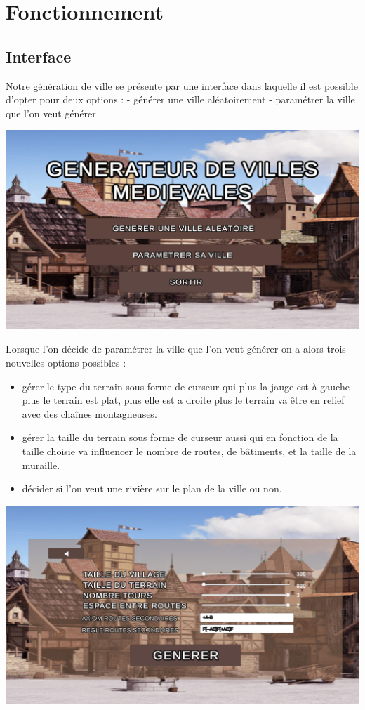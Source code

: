 \section{Fonctionnement}

\subsection{Interface}

Notre génération de ville se présente par une interface dans laquelle il est possible d'opter pour deux options :
		- générer une ville aléatoirement 
		- paramétrer la ville que l'on veut générer

\begin{center}
	\centering
    \includegraphics[height = 5 cm]{images/Interface_1.png}\\
\end{center}

Lorsque l'on décide de paramétrer la ville que l'on veut générer on a alors trois nouvelles options possibles :
\begin{itemize}
	\item gérer le type du terrain sous forme de curseur qui plus la jauge est à gauche plus le terrain est plat, plus elle est a droite plus le terrain va être en relief avec des chaînes montagneuses.
	\item gérer la taille du terrain sous forme de curseur aussi qui en fonction de  la taille choisie va influencer le nombre de routes, de bâtiments, et la taille de la muraille.
	\item décider si l'on veut une rivière sur le plan de la ville ou non.
\end{itemize}

\begin{center}
	\centering
    \includegraphics[height = 5 cm]{images/Interface_2.png}\\
\end{center}

